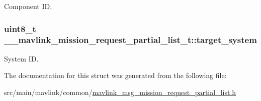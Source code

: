 Component I\+D. 

\hypertarget{struct____mavlink__mission__request__partial__list__t_aa4ec7ce5b44a621b414861aa5e575cc6}{
\subsubsection[{target\+\_\+system}]{\setlength{\rightskip}{0pt plus 5cm}uint8\+\_\+t \+\_\+\+\_\+mavlink\+\_\+mission\+\_\+request\+\_\+partial\+\_\+list\+\_\+t\+::target\+\_\+system}}\label{struct____mavlink__mission__request__partial__list__t_aa4ec7ce5b44a621b414861aa5e575cc6}


System I\+D. 



The documentation for this struct was generated from the following file\+:\begin{DoxyCompactItemize}
\item 
src/main/mavlink/common/\hyperlink{mavlink__msg__mission__request__partial__list_8h}{mavlink\+\_\+msg\+\_\+mission\+\_\+request\+\_\+partial\+\_\+list.\+h}\end{DoxyCompactItemize}
